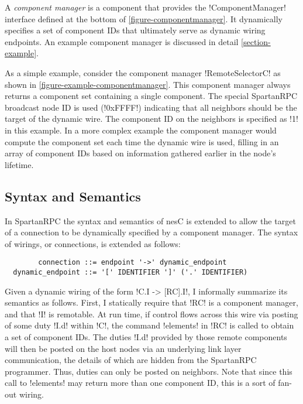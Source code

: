 A \emph{component manager} is a component that provides the !ComponentManager! interface defined
at the bottom of \autoref{figure-componentmanager}. It dynamically specifies a set of component
IDs that ultimately serve as dynamic wiring endpoints. An example component manager is discussed
in detail \autoref{section-example}.

As a simple example, consider the component manager !RemoteSelectorC! as shown in
\autoref{figure-example-componentmanager}. This component manager always returns a component set
containing a single component. The special SpartanRPC broadcast node ID is used (!0xFFFF!)
indicating that all neighbors should be the target of the dynamic wire. The component ID on the
neighbors is specified as !1! in this example. In a more complex example the component manager
would compute the component set each time the dynamic wire is used, filling in an array of
component IDs based on information gathered earlier in the node's lifetime.


\subsection{Syntax and Semantics}
\label{section-wiringsyntax}

In SpartanRPC the syntax and semantics of nesC is extended to allow the target of a connection
to be dynamically specified by a component manager. The syntax of wirings, or connections, is
extended as follows:

\singlespace
\begin{Verbatim}
        connection ::= endpoint '->' dynamic_endpoint
  dynamic_endpoint ::= '[' IDENTIFIER ']' ('.' IDENTIFIER)
\end{Verbatim}
\primaryspacing

Given a dynamic wiring of the form !C.I -> [RC].I!, I informally summarize its semantics as
follows. First, I statically require that !RC! is a component manager, and that !I! is
remotable. At run time, if control flows across this wire via posting of some duty !I.d! within
!C!, the command !elements! in !RC! is called to obtain a set of component IDs. The duties !I.d!
provided by those remote components will then be posted on the host nodes via an underlying link
layer communication, the details of which are hidden from the SpartanRPC programmer. Thus,
duties can only be posted on neighbors. Note that since this call to !elements! may return more
than one component ID, this is a sort of fan-out wiring.

